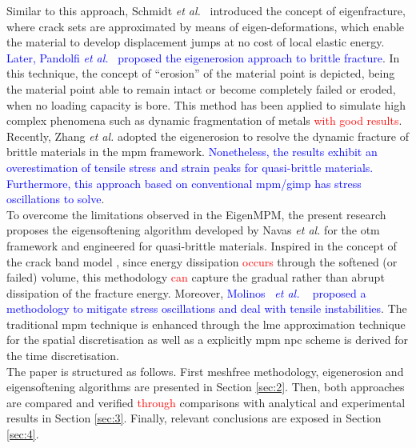 \documentclass[preprint,12pt,a4paper]{elsarticle}
\newcommand{\etal}{
  \textit{et al.}
}
\begin{document}
Similar to this approach, Schmidt {\it et al.}~\cite{Schmidt_2009} introduced the concept of eigenfracture, where crack sets are approximated by means of eigen-deformations, which
enable the material to develop displacement jumps at no cost of local
elastic energy. \textcolor{blue}{Later, Pandolfi {\it et al.}~\cite{Pandolfi_2012,Pandolfi_2013} proposed the eigenerosion approach to brittle fracture}. In this technique, the concept of ``erosion'' of
the material point is depicted, being the material point able to remain intact or become completely failed or eroded, when no loading capacity is bore. This method has been applied to simulate high
complex phenomena such as dynamic fragmentation of metals
\cite{Li_2015} \textcolor{red}{with good results}. Recently, Zhang {\it et al.}
\cite{Zhang_EE_2020} adopted the eigenerosion to resolve the dynamic
fracture of brittle materials in the \acrshort{mpm}
framework. \textcolor{blue}{Nonetheless, the results exhibit an overestimation of tensile stress and strain peaks for quasi-brittle materials. Furthermore, this approach based on conventional \acrshort{mpm}/\acrshort{gimp} has stress oscillations to solve}.\\

To overcome the limitations observed in the EigenMPM, the present research proposes the eigensoftening algorithm developed by Navas {\it et al.}
\cite{Navas_2017_ES,Navas2018a} for the \acrshort{otm} framework and
engineered for quasi-brittle materials. Inspired in the concept of the
crack band model \cite{Bazant83}, since energy dissipation \textcolor{red}{occurs} through the softened (or failed) volume, this methodology \textcolor{red}{can} capture the gradual rather than abrupt
dissipation of the fracture energy. Moreover,  \textcolor{blue}{Molinos~\etal~\cite{Molinos2020} proposed a methodology to mitigate stress oscillations and deal with tensile instabilities}. The traditional \acrshort{mpm} technique is enhanced through the \acrfull{lme} approximation technique \cite{Arroyo2006} for the spatial discretisation as well as a explicitly \acrshort{mpm} \acrfull{npc} scheme is derived for the time discretisation.\\

The paper is structured as follows. First meshfree methodology,
eigenerosion and eigensoftening algorithms are presented in Section
\ref{sec:2}. Then, both approaches are compared and verified \textcolor{red}{through}
comparisons with analytical and experimental results in Section \ref{sec:3}. Finally, relevant conclusions
are exposed in Section \ref{sec:4}.
\end{document}
